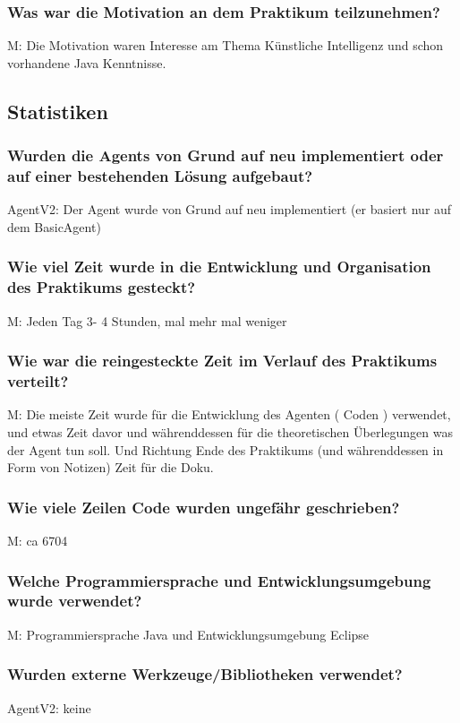 \documentclass[runningheads]{llncs}
\begin{document}
\subsubsection{Was war die Motivation an dem Praktikum teilzunehmen?\\}
M: Die Motivation waren Interesse am Thema Künstliche Intelligenz und schon vorhandene Java Kenntnisse.
\subsection{Statistiken}
\subsubsection{Wurden die Agents von Grund auf neu implementiert oder auf einer bestehenden Lösung aufgebaut?\\}
AgentV2: Der Agent wurde von Grund auf neu implementiert (er basiert nur auf dem BasicAgent)
\subsubsection{Wie viel Zeit wurde in die Entwicklung und Organisation des Praktikums gesteckt?\\}
M: Jeden Tag 3- 4 Stunden, mal mehr mal weniger
\subsubsection{Wie war die reingesteckte Zeit im Verlauf des Praktikums verteilt?\\}
M: Die meiste Zeit wurde für die Entwicklung des Agenten ( Coden ) verwendet, und etwas Zeit davor und währenddessen für die theoretischen Überlegungen was der Agent tun soll. Und Richtung Ende des Praktikums (und währenddessen in Form von Notizen) Zeit für die Doku. 
\subsubsection{Wie viele Zeilen Code wurden ungefähr geschrieben?\\}
M: ca 6704
\subsubsection{Welche Programmiersprache und Entwicklungsumgebung wurde verwendet?\\}
M: Programmiersprache Java und Entwicklungsumgebung Eclipse
\subsubsection{Wurden externe Werkzeuge/Bibliotheken verwendet?\\}
AgentV2: keine
\end{document}
